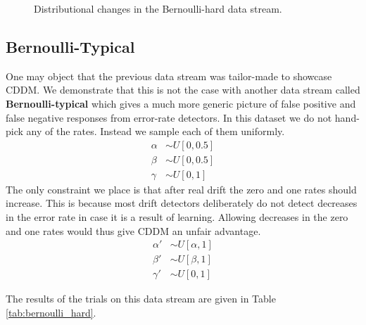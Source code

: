 \begin{figure}
    \centering
    \caption{Distributional changes in the Bernoulli-hard data stream.}
    \label{fig:bernoulli_hard}
\end{figure}

\subsection{Bernoulli-Typical}

One may object that the previous data stream was tailor-made to showcase CDDM. We demonstrate that this is not the case with another data stream called {\bf Bernoulli-typical} which gives a much more generic picture of false positive and false negative responses from error-rate detectors. In this dataset we do not hand-pick any of the rates. Instead we sample each of them uniformly.
\begin{align}
  \alpha &\sim U[0, 0.5] \\
  \beta &\sim U[0, 0.5] \\
  \gamma &\sim U[0, 1]
\end{align}
The only constraint we place is that after real drift the zero and one rates should increase. This is because most drift detectors deliberately do not detect decreases in the error rate in case it is a result of learning. Allowing decreases in the zero and one rates would thus give CDDM an unfair advantage.
\begin{align}
  \alpha' &\sim U[\alpha, 1] \\
  \beta' &\sim U[\beta, 1] \\
  \gamma' &\sim U[0, 1]
\end{align}

The results of the trials on this data stream are given in Table \ref{tab:bernoulli_hard}.
